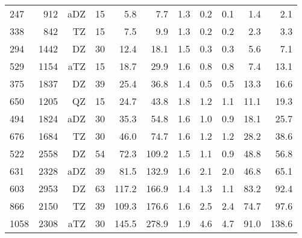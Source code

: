 \begin{table}[H]
\begin{tabular}{lrrrrrrrrrr}
 247&  912&   aDZ&    15&                 5.8 &                7.7&     1.3 &                0.2 &                0.1&                 1.4&                 2.1\\
 338&  842&    TZ&    15&                 7.5 &                9.9&     1.3 &                0.2 &                0.2&                 2.3&                 3.3\\
 294& 1442&    DZ&    30&                12.4 &               18.1&     1.5 &                0.3 &                0.3&                 5.6&                 7.1\\
 529& 1154&   aTZ&    15&                18.7 &               29.9&     1.6 &                0.8 &                0.8&                 7.4&                13.1\\
 375& 1837&    DZ&    39&                25.4 &               36.8&     1.4 &                0.5 &                0.5&                13.3&                16.6\\
 650& 1205&    QZ&    15&                24.7 &               43.8&     1.8 &                1.2 &                1.1&                11.1&                19.3\\
 494& 1824&   aDZ&    30&                35.3 &               54.8&     1.6 &                1.0 &                0.9&                18.1&                25.7\\
 676& 1684&    TZ&    30&                46.0 &               74.7&     1.6 &                1.2 &                1.2&                28.2&                38.6\\
 522& 2558&    DZ&    54&                72.3 &              109.2&     1.5 &                1.1 &                0.9&                48.8&                56.8\\
 631& 2328&   aDZ&    39&                81.5 &              132.9&     1.6 &                2.1 &                2.0&                46.8&                65.1\\
 603& 2953&    DZ&    63&               117.2 &              166.9&     1.4 &                1.3 &                1.1&                83.2&                92.4\\
 866& 2150&    TZ&    39&               109.3 &              176.6&     1.6 &                2.5 &                2.4&                74.7&                97.6\\
1058& 2308&   aTZ&    30&               145.5 &              278.9&     1.9 &                4.6 &                4.7&                91.0&               138.6\\

\end{tabular}
\end{table}
